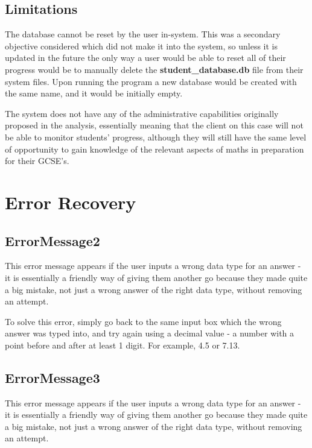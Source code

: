 \subsection{Limitations}

The database cannot be reset by the user in-system. This was a secondary objective considered which did not make it into the system, so unless it is updated in the future the only way a user would be able to reset all of their progress would be to manually delete the \textbf{student\_database.db} file from their system files. Upon running the program a new database would be created with the same name, and it would be initially empty.

The system does not have any of the administrative capabilities originally proposed in the analysis, essentially meaning that the client on this case will not be able to monitor students' progress, although they will still have the same level of opportunity to gain knowledge of the relevant aspects of maths in preparation for their GCSE's.





\section{Error Recovery}

\subsection{ErrorMessage2}

This error message appears if the user inputs a wrong data type for an answer - it is essentially a friendly way of giving them another go because they made quite a big mistake, not just a wrong answer of the right data type, without removing an attempt.


To solve this error, simply go back to the same input box which the wrong answer was typed into, and try again using a decimal value - a number with a point before and after at least 1 digit. For example, 4.5 or 7.13.

\subsection{ErrorMessage3}

This error message appears if the user inputs a wrong data type for an answer - it is essentially a friendly way of giving them another go because they made quite a big mistake, not just a wrong answer of the right data type, without removing an attempt.

